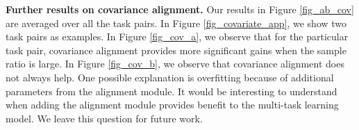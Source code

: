 \textbf{Further results on covariance alignment.}
Our results in Figure \ref{fig_ab_cov} are averaged over all the task pairs.
In Figure \ref{fig_covariate_app}, we show two task pairs as examples.
In Figure \ref{fig_cov_a}, we observe that for the particular task pair, covariance alignment provides more significant gains when the sample ratio is large.
In Figure \ref{fig_cov_b}, we observe that covariance alignment does not always help.
One possible explanation is overfitting because of additional parameters from the alignment module.
It would be interesting to understand when adding the alignment module provides benefit to the multi-task learning model.
We leave this question for future work.

